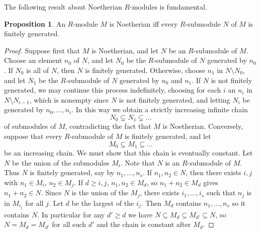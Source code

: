 \documentclass{article}
\theoremstyle{definition}\newtheorem{definition}{Definition}[subsection]
\theoremstyle{definition}\newtheorem{remark}[definition]{Remark}
\theoremstyle{definition}\newtheorem*{example}{Example}
\theoremstyle{definition}\newtheorem*{note}{Note}
\newtheorem{proposition}[definition]{Proposition}
\begin{document}
The following result about Noetherian $ R $-modules is fundamental.

\begin{proposition}
An $ R $-module $ M $ is Noetherian iff every $ R $-submodule $ N $ of $ M $ is finitely generated.
\end{proposition}

\begin{proof}
Suppose first that $ M $ is Noetherian, and let $ N $ be an $ R $-submodule of $ M $. Choose an element $ n_0 $ of $ N $, and let $ N_0 $ be the $ R $-submodule of $ N $ generated by $ n_0 $. If $ N_0 $ is all of $ N $, then $ N $ is finitely generated. Otherwise, choose $ n_1 $ in $ N \setminus N_0 $, and let $ N_1 $ be the $ R $-submodule of $ N $ generated by $ n_0 $ and $ n_1 $. If $ N $ is not finitely generated, we may continue this process indefinitely, choosing for each $ i $ an $ n_i $ in $ N \setminus N_{i - 1} $, which is nonempty since $ N $ is not finitely generated, and letting $ N_i $ be generated by $ n_0, \dots, n_i $. In this way we obtain a strictly increasing infinite chain
$$ N_0 \subsetneq N_1 \subsetneq \dots $$
of submodules of $ M $, contradicting the fact that $ M $ is Noetherian. Conversely, suppose that every $ R $-submodule of $ M $ is finitely generated, and let
$$ M_0 \subseteq M_1 \subseteq \dots $$
be an increasing chain. We must show that this chain is eventually constant. Let $ N $ be the union of the submodules $ M_i $. Note that $ N $ is an $ R $-submodule of $ M $. Thus $ N $ is finitely generated, say by $ n_1, \dots, n_s $. If $ n_1, n_2 \in N $, then there exists $ i, j $ with $ n_1 \in M_i $, $ n_2 \in M_j $. If $ d \ge i, j $, $ n_1, n_2 \in M_d $, so $ n_1 + n_2 \in M_d $ gives $ n_1 + n_2 \in N $. Since $ N $ is the union of the $ M_j $, there exists $ i_1, \dots, i_s $ such that $ n_j $ is in $ M_{i_j} $ for all $ j $. Let $ d $ be the largest of the $ i_j $. Then $ M_d $ contains $ n_1, \dots, n_s $ so it contains $ N $. In particular for any $ d' \ge d $ we have $ N \subseteq M_d \subseteq M_{d'} \subseteq N $, so $ N = M_d = M_{d'} $ for all such $ d' $ and the chain is constant after $ M_d $.
\end{proof}
\end{document}
